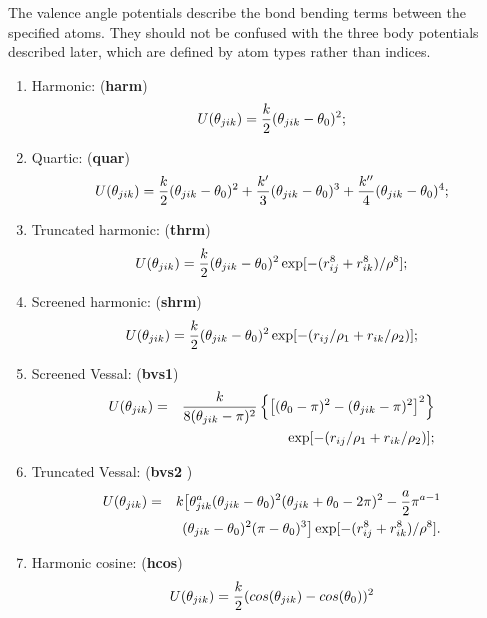 The valence angle potentials describe the bond bending terms between
the specified atoms. They should not be confused with the three body
potentials described later, which are defined by atom types rather
than indices.
\begin{enumerate}
\item Harmonic:  ({\bf harm})
\begin{equation}
 U(\theta_{jik})= {k\over 2} (\theta_{jik} - \theta_0)^2;
\end{equation}
\item Quartic:  ({\bf quar})
\begin{equation}
 U(\theta_{jik})= {k\over 2}(\theta_{jik} - \theta_0)^2 + {k'\over
3}(\theta_{jik} -
\theta_0)^3 + {k''\over 4}(\theta_{jik} - \theta_0)^4;
\end{equation}
\item Truncated harmonic:  ({\bf thrm})
\begin{equation}
U(\theta_{jik})= {k\over 2} (\theta_{jik} - \theta_0)^2
\exp[-(r_{ij}^8 + r_{ik}^8)/\rho^8];
\end{equation}
\item Screened harmonic:  ({\bf shrm})
\begin{equation}
 U(\theta_{jik})= {k\over 2} (\theta_{jik} - \theta_0)^2
\exp[-(r_{ij}/\rho_1 + r_{ik}/\rho_2)] ;
\end{equation}
\item Screened Vessal\cite{vessal-94a}:  ({\bf bvs1})
\begin{eqnarray}
U(\theta_{jik})&=& {k \over 8(\theta_{jik}-\pi)^2}\left\{ \left[
(\theta_0 -\pi)^2 -(\theta_{jik}-\pi)^2\right]^2
\right\} \nonumber \\
& &  \exp[-(r_{ij}/\rho_1 + r_{ik}/\rho_2)];
\end{eqnarray}
\item Truncated Vessal\cite{smith-95a}: ({\bf bvs2 })
\begin{eqnarray}
U(\theta_{jik})&=& k\big[ \theta_{jik}^a (\theta_{jik}-\theta_0)^2
(\theta_{jik}+\theta_0-2\pi)^2  - {a\over 2} \pi^{a-1}\nonumber \\
& & (\theta_{jik}-\theta_0)^2(\pi - \theta_0)^3\big]
\exp[-(r_{ij}^8 + r_{ik}^8)/\rho^8].
\end{eqnarray}
\item Harmonic cosine: ({\bf hcos})
\begin{equation}
U(\theta_{jik})={k\over 2}(cos(\theta_{jik}) -cos(\theta_{0}))^{2}
\end{equation}

\end{enumerate}
